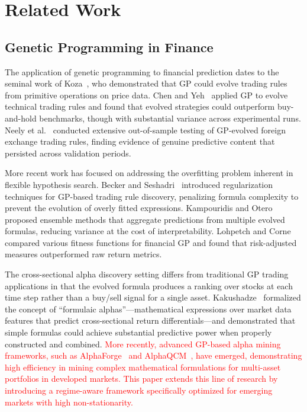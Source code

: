 \documentclass{ieeeaccess}
\newcommand{\revised}[1]{\textcolor{red}{#1}}
\begin{document}
\section{Related Work}
\label{sec:related}

\subsection{Genetic Programming in Finance}
The application of genetic programming to financial prediction dates to the seminal work of Koza~\cite{b6}, who demonstrated that GP could evolve trading rules from primitive operations on price data. Chen and Yeh~\cite{b8} applied GP to evolve technical trading rules and found that evolved strategies could outperform buy-and-hold benchmarks, though with substantial variance across experimental runs. Neely et al.~\cite{b9} conducted extensive out-of-sample testing of GP-evolved foreign exchange trading rules, finding evidence of genuine predictive content that persisted across validation periods.

More recent work has focused on addressing the overfitting problem inherent in flexible hypothesis search. Becker and Seshadri~\cite{b10} introduced regularization techniques for GP-based trading rule discovery, penalizing formula complexity to prevent the evolution of overly fitted expressions. Kampouridis and Otero~\cite{b11} proposed ensemble methods that aggregate predictions from multiple evolved formulas, reducing variance at the cost of interpretability. Lohpetch and Corne~\cite{b12} compared various fitness functions for financial GP and found that risk-adjusted measures outperformed raw return metrics.

The cross-sectional alpha discovery setting differs from traditional GP trading applications in that the evolved formula produces a ranking over stocks at each time step rather than a buy/sell signal for a single asset. Kakushadze~\cite{b13} formalized the concept of ``formulaic alphas''---mathematical expressions over market data features that predict cross-sectional return differentials---and demonstrated that simple formulas could achieve substantial predictive power when properly constructed and combined. \revised{More recently, advanced GP-based alpha mining frameworks, such as AlphaForge~\cite{b35} and AlphaQCM~\cite{b36}, have emerged, demonstrating high efficiency in mining complex mathematical formulations for multi-asset portfolios in developed markets. This paper extends this line of research by introducing a regime-aware framework specifically optimized for emerging markets with high non-stationarity.}
\end{document}
